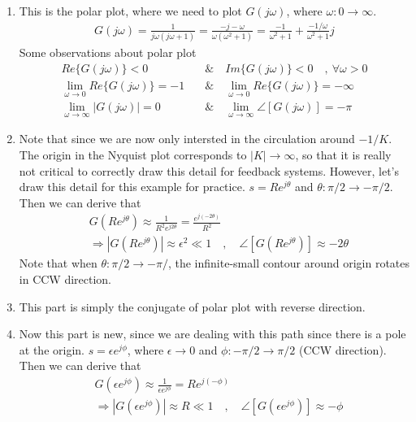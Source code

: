 \documentclass[twoside]{article}
\begin{document}
\begin{enumerate}
  \item This is the polar plot, where we need to plot $G(j \omega)$, where $\omega : 0 \to
    \infty$. 
    \begin{align*}
      G(j \omega) = \frac{1}{j \omega (j \omega +1)} = \frac{ -j  - \omega }{\omega
      (\omega^2 + 1) } = \frac{-1}{\omega^2 + 1} + \frac{-1/\omega}{
      \omega^2 + 1} j
    \end{align*}
%
   Some observations about polar plot
    \begin{align*}
       Re \lbrace G(j \omega) \rbrace < 0 \quad & \&  \quad  Im \lbrace G(j
                                                \omega) \rbrace < 0 \quad , \ \forall  \omega > 0 
      \\
        \lim_{\omega \to 0} Re \lbrace G(j \omega) \rbrace = - 1
       \quad & \& \quad
       \lim_{\omega \to 0} Re \lbrace G(j \omega) \rbrace = - \infty
        \\
       \lim_{\omega \to \infty} | G(j \omega) | = 0
        \quad & \& \quad
      \lim_{\omega \to \infty} \angle [ G(j \omega) ] = -\pi
      \end{align*}
  \item Note that since we are now only intersted in the circulation around
    $-1/K$. The origin in the Nyquist plot corresponds to $| K | \to
    \infty$, so that it is really not critical to correctly draw this
    detail for feedback systems. 
     However, let's draw this detail for this example for practice. 
     $s = R e^{j \theta}$ and $\theta : \pi/2 \to -\pi/2$.  Then 
   we can derive that  
   \begin{align*}
     & G \left( R e^{j \theta} \right) \approx \frac{1}{R^2 e^{j
       2 \theta}} = \frac{e^{j (-2 \theta)}}{R^2}
       \\
    &\Rightarrow | G \left( R e^{j \theta} \right) | \approx
      \epsilon^2 \ll 1
   \quad , \quad \angle [ G \left( R e^{j \theta} \right) ] \approx -2
      \theta
   \end{align*}
   Note that when $\theta : \pi/2 \to -\pi/$, the infinite-small 
   contour around origin rotates in CCW direction. 
   \item This part is simply the conjugate of polar plot with reverse
     direction. 
  \item Now this part is new, since we are dealing with this path
    since there is a pole at the origin. 
     $s = \epsilon e^{j \phi}$, where $\epsilon \to 0$ and $\phi :
     -\pi/2 \to \pi/2$ (CCW direction).  Then  we can derive that  
   \begin{align*}
     & G \left( \epsilon e^{j \phi} \right) \approx \frac{1}{\epsilon e^{j
        \phi}} = R e^{j (-\phi)}
       \\
    &\Rightarrow | G \left(\epsilon e^{j \phi} \right) | \approx
     R \ll 1
   \quad , \quad \angle [ G \left( \epsilon e^{j \phi} \right) ] \approx -\phi
   \end{align*}
\end{enumerate}
\end{document}
